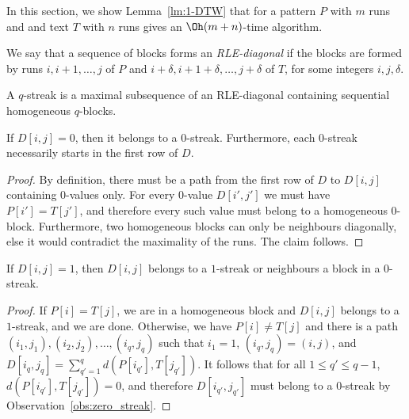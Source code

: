 In this section, we show Lemma~\ref{lm:1-DTW} that for a pattern $P$ with $m$ runs and and text $T$ with $n$ runs gives an $\Oh(m+n)$-time algorithm.  

\begin{definition}
We say that a sequence of blocks forms an \emph{RLE-diagonal} if the blocks are formed by runs $i, i+1, \ldots, j$ of $P$ and $i+\delta, i+1+\delta, \ldots, j+\delta$ of $T$, for some integers $i,j,\delta$. 
\end{definition}

\begin{definition}[Streak]
A $q$-streak is a maximal subsequence of an RLE-diagonal containing sequential homogeneous $q$-blocks. 
\end{definition}

\begin{observation}\label{obs:zero_streak}
If $D[i,j] = 0$, then it belongs to a $0$-streak. Furthermore, each $0$-streak necessarily starts in the first row of $D$.
\end{observation}
\begin{proof}
By definition, there must be a path from the first row of $D$ to $D[i,j]$ containing $0$-values only. For every $0$-value $D[i',j']$ we must have $P[i'] = T[j']$, and therefore every such value must belong to a homogeneous $0$-block. Furthermore, two homogeneous blocks can only be neighbours diagonally, else it would contradict the maximality of the runs. The claim follows. 
\end{proof}

\begin{observation}\label{obs:one_value}
If $D[i,j] = 1$, then $D[i,j]$ belongs to a $1$-streak or neighbours a block in a $0$-streak.
\end{observation}
\begin{proof}
If $P[i]=T[j]$, we are in a homogeneous block and $D[i,j]$ belongs to a $1$-streak, and we are done. Otherwise, we have $P[i] \neq T[j]$ and there is a path $(i_1,j_1), (i_2,j_2), \ldots, (i_q,j_q)$ such that $i_1 = 1$, $(i_q,j_q) = (i,j)$, and $D[i_{q},j_{q}] = \sum_{q'=1}^{q} d(P[i_{q'}], T[j_{q'}])$. It follows that for all $1 \le q' \le q-1$, $d(P[i_{q'}], T[j_{q'}]) = 0$, and therefore $D[i_{q'}, j_{q'}]$ must belong to a $0$-streak by Observation~\ref{obs:zero_streak}. 
\end{proof}
 

